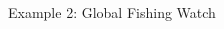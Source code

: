 \documentclass[xcolor=x11names, aspectratio=169, compress]{beamer}
\renewcommand{\(}{\begin{columns}}
\renewcommand{\)}{\end{columns}}
\newcommand{\<}[1]{\begin{column}{#1}}
\renewcommand{\>}{\end{column}}
\begin{document}
\begin{frame}{Example 2: Global Fishing Watch }
\begin{columns}[T]
\begin{column}{0.4\textwidth}
\begin{center}
\begin{itemize}

\end{itemize}
\end{center}
\end{column}
\end{columns}
\end{frame}
\end{document}
